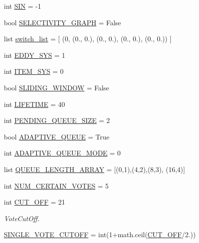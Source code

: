 \begin{DoxyCompactItemize}
\item 
int \hyperlink{namespacereorder_a46cfe1555e9636aa02be672a0dbfcee8}{S\+IN} = -\/1
\item 
bool \hyperlink{namespacereorder_a7bfe56554845cde1c15e59ba47f471ed}{S\+E\+L\+E\+C\+T\+I\+V\+I\+T\+Y\+\_\+\+G\+R\+A\+PH} = False
\item 
list \hyperlink{namespacereorder_abbafede9e00a5523a3cfea9fc4ff4764}{switch\+\_\+list} = \mbox{[} (0, (0., 0.), (0., 0.), (0., 0.), (0., 0.)) \mbox{]}
\item 
int \hyperlink{namespacereorder_a549d2c90f3f5922ad1442df2113fca1b}{E\+D\+D\+Y\+\_\+\+S\+YS} = 1
\item 
int \hyperlink{namespacereorder_ae8b7db6fd373a0c3225ad361f894aee2}{I\+T\+E\+M\+\_\+\+S\+YS} = 0
\item 
bool \hyperlink{namespacereorder_adf3c8ab64e62d33397a389d7ba49fe69}{S\+L\+I\+D\+I\+N\+G\+\_\+\+W\+I\+N\+D\+OW} = False
\item 
int \hyperlink{namespacereorder_a06966aed6fa634825f18ad256f386496}{L\+I\+F\+E\+T\+I\+ME} = 40
\item 
int \hyperlink{namespacereorder_a642cb0e1f266db761b270ea65af5425a}{P\+E\+N\+D\+I\+N\+G\+\_\+\+Q\+U\+E\+U\+E\+\_\+\+S\+I\+ZE} = 2
\item 
bool \hyperlink{namespacereorder_a5ca20fa392feca13076621985b096ed0}{A\+D\+A\+P\+T\+I\+V\+E\+\_\+\+Q\+U\+E\+UE} = True
\item 
int \hyperlink{namespacereorder_ae5f3a5957b65dd5d074c52ef01e0f732}{A\+D\+A\+P\+T\+I\+V\+E\+\_\+\+Q\+U\+E\+U\+E\+\_\+\+M\+O\+DE} = 0
\item 
list \hyperlink{namespacereorder_af8d4fe75258dd9f8b4c8cdb1b5b68ad1}{Q\+U\+E\+U\+E\+\_\+\+L\+E\+N\+G\+T\+H\+\_\+\+A\+R\+R\+AY} = \mbox{[}(0,1),(4,2),(8,3), (16,4)\mbox{]}
\item 
int \hyperlink{namespacereorder_a157bc167f366f75c9ba8d3e36e8d8540}{N\+U\+M\+\_\+\+C\+E\+R\+T\+A\+I\+N\+\_\+\+V\+O\+T\+ES} = 5
\item 
int \hyperlink{namespacereorder_a914791c176a78c026dc76a18bcd88d73}{C\+U\+T\+\_\+\+O\+FF} = 21
\begin{DoxyCompactList}\small\item\em Vote\+Cut\+Off. \end{DoxyCompactList}\item 
\hyperlink{namespacereorder_afa8e106b735033b706b1412e12f6783b}{S\+I\+N\+G\+L\+E\+\_\+\+V\+O\+T\+E\+\_\+\+C\+U\+T\+O\+FF} = int(1+math.\+ceil(\hyperlink{namespacereorder_a914791c176a78c026dc76a18bcd88d73}{C\+U\+T\+\_\+\+O\+FF}/2.))

\end{DoxyCompactItemize}
